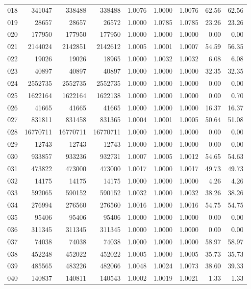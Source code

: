 \begin{longtable}{crrrrrrrr}
018 & 341047 & 338488 & 338488 & 1.0076 & 1.0000 & 1.0076 & 62.56 & 62.56 \\
019 & 28657 & 28657 & 26572 & 1.0000 & 1.0785 & 1.0785 & 23.26 & 23.26 \\
020 & 177950 & 177950 & 177950 & 1.0000 & 1.0000 & 1.0000 & 0.00 & 0.00 \\
021 & 2144024 & 2142851 & 2142612 & 1.0005 & 1.0001 & 1.0007 & 54.59 & 56.35 \\
022 & 19026 & 19026 & 18965 & 1.0000 & 1.0032 & 1.0032 & 6.08 & 6.08 \\
023 & 40897 & 40897 & 40897 & 1.0000 & 1.0000 & 1.0000 & 32.35 & 32.35 \\
024 & 2552735 & 2552735 & 2552735 & 1.0000 & 1.0000 & 1.0000 & 0.00 & 0.00 \\
025 & 1622164 & 1622164 & 1622138 & 1.0000 & 1.0000 & 1.0000 & 0.00 & 0.70 \\
026 & 41665 & 41665 & 41665 & 1.0000 & 1.0000 & 1.0000 & 16.37 & 16.37 \\
027 & 831811 & 831458 & 831365 & 1.0004 & 1.0001 & 1.0005 & 50.64 & 51.08 \\
028 & 16770711 & 16770711 & 16770711 & 1.0000 & 1.0000 & 1.0000 & 0.00 & 0.00 \\
029 & 12743 & 12743 & 12743 & 1.0000 & 1.0000 & 1.0000 & 0.00 & 0.00 \\
030 & 933857 & 933236 & 932731 & 1.0007 & 1.0005 & 1.0012 & 54.65 & 54.63 \\
031 & 473822 & 473000 & 473000 & 1.0017 & 1.0000 & 1.0017 & 49.73 & 49.73 \\
032 & 14175 & 14175 & 14175 & 1.0000 & 1.0000 & 1.0000 & 4.26 & 4.26 \\
033 & 592065 & 590152 & 590152 & 1.0032 & 1.0000 & 1.0032 & 38.26 & 38.26 \\
034 & 276994 & 276560 & 276560 & 1.0016 & 1.0000 & 1.0016 & 54.75 & 54.75 \\
035 & 95406 & 95406 & 95406 & 1.0000 & 1.0000 & 1.0000 & 0.00 & 0.00 \\
036 & 311345 & 311345 & 311345 & 1.0000 & 1.0000 & 1.0000 & 0.00 & 0.00 \\
037 & 74038 & 74038 & 74038 & 1.0000 & 1.0000 & 1.0000 & 58.97 & 58.97 \\
038 & 452248 & 452022 & 452022 & 1.0005 & 1.0000 & 1.0005 & 35.73 & 35.73 \\
039 & 485565 & 483226 & 482066 & 1.0048 & 1.0024 & 1.0073 & 38.60 & 39.33 \\
040 & 140837 & 140811 & 140543 & 1.0002 & 1.0019 & 1.0021 & 1.33 & 1.33 \\

\end{longtable}
